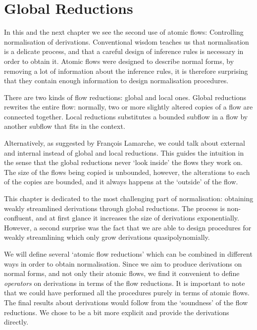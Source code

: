 \chapter{Global Reductions}\label{chapter:GlobalReductions}


In this and the next chapter we see the second use of atomic flows: Controlling normalisation of derivations. Conventional wisdom teaches us that normalisation is a delicate process, and that a careful design of inference rules is necessary in order to obtain it. Atomic flows were designed to describe normal forms, by removing a lot of information about the inference rules, it is therefore surprising that they contain enough information to design normalisation procedures.

There are two kinds of flow reductions: global and local ones. Global reductions rewrites the entire flow: normally, two or more slightly altered copies of a flow are connected together. Local reductions substitutes a bounded subflow in a flow by another subflow that fits in the context.


Alternatively, as suggested by Fran\c{c}ois Lamarche, we could talk about external and internal instead of global and local reductions. This guides the intuition in the sense that the global reductions never `look inside' the flows they work on. The size of the flows being copied is unbounded, however, the alterations to each of the copies are bounded, and it always happens at the `outside' of the flow.

This chapter is dedicated to the most challenging part of normalisation: obtaining weakly streamlined derivations through global reductions. The process is non-confluent, and at first glance it increases the size of derivations exponentially. However, a second surprise was the fact that we are able to design procedures for weakly streamlining which only grow derivations quasipolynomially.

We will define several `atomic flow reductions' which can be combined in different ways in order to obtain normalisation. Since we aim to produce derivations on normal forms, and not only their atomic flows, we find it convenient to define \emph{operators} on derivations in terms of the flow reductions. It is important to note that we could have performed all the procedures purely in terms of atomic flows. The final results about derivations would follow from the `soundness' of the flow reductions. We chose to be a bit more explicit and provide the derivations directly.

